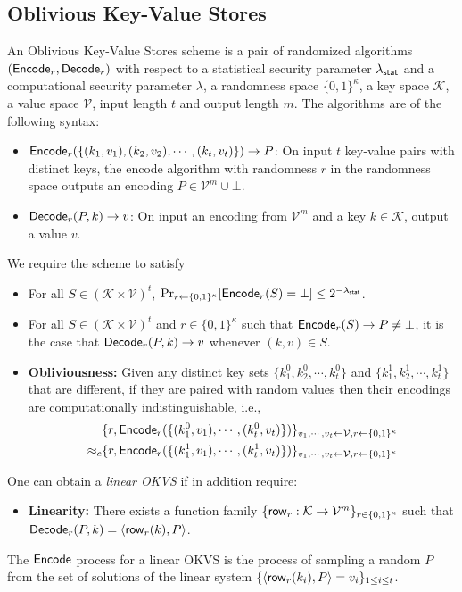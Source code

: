 \subsection{Oblivious Key-Value Stores}
\begin{definition}\label{def:OKVS}
  An Oblivious Key-Value Stores scheme is a pair of randomized algorithms $({\sf Encode}_r,{\sf Decode}_r)$ with respect to a statistical security parameter $\lambda_{\sf stat}$ and a computational security parameter $\lambda$, a randomness space $\{0,1\}^\kappa$, a key space $\mathcal{K}$, a value space $\mathcal{V}$, input length $t$ and output length $m$. The algorithms are of the following syntax: 
  \begin{itemize}
    \item ${\sf Encode}_r(\{(k_1,v_1),(k_2,v_2),\cdots,(k_t,v_t)\})\rightarrow P$: On input $t$ key-value pairs with distinct keys, the encode algorithm with randomness $r$ in the randomness space outputs an encoding $P\in\mathcal{V}^m\cup\bot$.
    \item ${\sf Decode}_r(P,k)\rightarrow v$: On input an encoding from $\mathcal{V}^m$ and a key $k\in\mathcal{K}$, output a value $v$. 
  \end{itemize}
  We require the scheme to satisfy
  \begin{itemize}
    \item For all $S\in(\mathcal{K}\times\mathcal{V})^t$, $\Pr_{r\leftarrow\{0,1\}^\kappa}[{\sf Encode}_r(S)=\bot]\le 2^{-\lambda_{\sf stat}}$. 
    \item For all $S\in(\mathcal{K}\times \mathcal{V})^t$ and $r\in \{0,1\}^\kappa$ such that ${\sf Encode}_r(S)\rightarrow P\not=\bot$, it is the case that ${\sf Decode}_r(P,k)\rightarrow v$ whenever $(k,v)\in S$. 
    \item \textbf{Obliviousness: }Given any distinct key sets $\{k_1^0,k_2^0,\cdots,k_t^0\}$ and $\{k_1^1,k_2^1,\cdots,k_t^1\}$ that are different, if they are paired with random values then their encodings are computationally indistinguishable, i.e., 
  \begin{align*}
    &\{r, {\sf Encode}_r(\{(k_1^0,v_1),\cdots,(k_t^0,v_t)\})\}_{v_1,\cdots,v_t\leftarrow \mathcal{V},r\leftarrow\{0,1\}^\kappa}\\
    \approx_c &\{r, {\sf Encode}_r(\{(k_1^1,v_1),\cdots,(k_t^1,v_t)\})\}_{v_1,\cdots,v_t\leftarrow \mathcal{V},r\leftarrow\{0,1\}^\kappa}
  \end{align*}
  \end{itemize}
One can obtain a \emph{linear OKVS} if in addition require:
\begin{itemize}
  \item \textbf{Linearity: }There exists a function family $\{{\sf row}_r:\mathcal{K}\rightarrow\mathcal{V}^m\}_{r\in\{0,1\}^\kappa}$ such that ${\sf Decode}_r(P,k) = \langle {\sf row}_r(k), P \rangle$. 
\end{itemize}
\end{definition}
The ${\sf Encode}$ process for a linear OKVS is the process of sampling a random $P$ from the set of solutions of the linear system $\{\langle {\sf row}_r(k_i), P \rangle = v_i\}_{1\le i\le t}$. 

